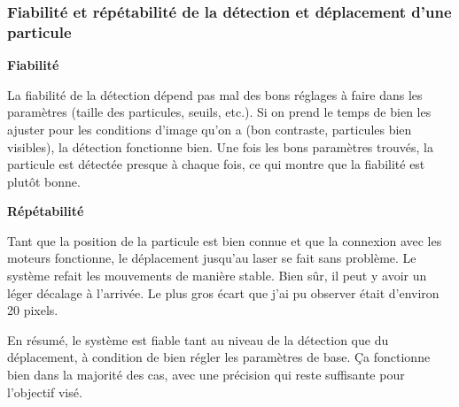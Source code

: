 \subsubsection{Fiabilité et répétabilité de la détection et déplacement d'une particule}
\textbf{Fiabilité}

La fiabilité de la détection dépend pas mal des bons réglages à faire dans les paramètres (taille des particules, seuils, etc.). Si on prend le temps de bien les ajuster pour les conditions d'image qu'on a (bon contraste, particules bien visibles), la détection fonctionne bien. Une fois les bons paramètres trouvés, la particule est détectée presque à chaque fois, ce qui montre que la fiabilité est plutôt bonne.

\textbf{Répétabilité}

Tant que la position de la particule est bien connue et que la connexion avec les moteurs fonctionne, le déplacement jusqu'au laser se fait sans problème. Le système refait les mouvements de manière stable. Bien sûr, il peut y avoir un léger décalage à l'arrivée. Le plus gros écart que j'ai pu observer était d'environ 20 pixels.

En résumé, le système est fiable tant au niveau de la détection que du déplacement, à condition de bien régler les paramètres de base. Ça fonctionne bien dans la majorité des cas, avec une précision qui reste suffisante pour l'objectif visé.